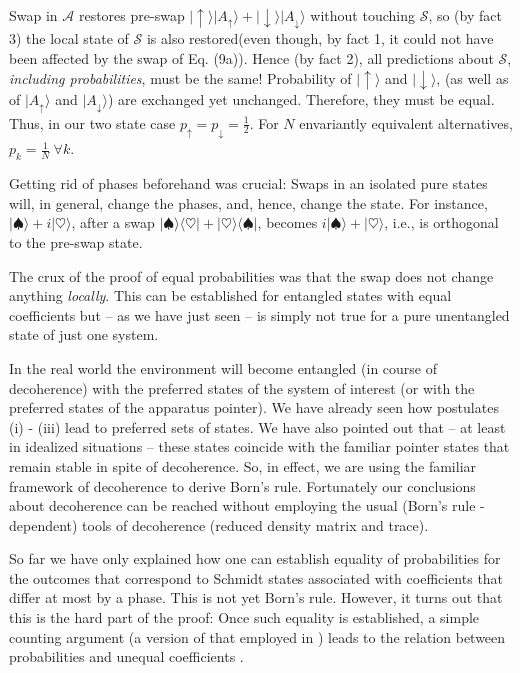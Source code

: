 \documentclass[aps,amsmath,amssymb,amsfonts,floatfix]{revtex4-1}
\newcommand{\bra}[1]    {\langle #1|}
\newcommand{\ket}[1]    {| #1 \rangle}
\newcommand{\cS}        {{\mathcal S}}
\newcommand{\cA}        {{\mathcal A}}
\newcommand{\+}         {\dagger}
\begin{document}
{%

\noindent  Swap in $\cA$ restores pre-swap $ \ket \uparrow \ket {A_\uparrow}  + \ket \downarrow \ket {A_\downarrow}$ without touching $\cS$, so (by fact 3) the local state of $\cS$  is also restored(even though, by fact 1, it could not have been affected by the swap of Eq. (9a)).
Hence (by fact 2), all predictions about $\cS$, {\it including probabilities}, must be the same!
Probability of $\ket \uparrow$ and $ \ket \downarrow$, (as well as of $\ket {A_\uparrow} $ and $\ket {A_\downarrow}$) are exchanged yet unchanged. Therefore, 
they must be equal. Thus, in our two state case 
$p_\uparrow=p_\downarrow= \frac 1 2$. For $N$ envariantly equivalent alternatives, $p_k= \frac 1 N\ \forall k$.

Getting rid of phases beforehand was crucial:
Swaps in an isolated pure states will, in general, change the phases, and, hence, change the state.  For instance, $\ket \spadesuit + i \ket \heartsuit$, after a swap $\ket \spadesuit \bra \heartsuit + \ket \heartsuit \bra \spadesuit$, becomes
$i \ket \spadesuit + \ket \heartsuit$, i.e., is orthogonal to the pre-swap state. 

The crux of the proof of
equal probabilities was that the swap does not change anything {\it locally}. This can be established
for entangled states with equal coefficients but -- as we have just seen -- is simply not true for a pure
unentangled state of just one system.

In the real world the environment will become entangled (in course of decoherence)
with the preferred states of the system of interest (or with the preferred states of the apparatus pointer).
We have already seen how postulates (i) - (iii) lead to preferred sets of states. We have also pointed
out that -- at least in idealized situations -- these states coincide with the familiar pointer states
that remain stable in spite of decoherence. So, in effect, we are using the familiar framework of
decoherence to derive Born's rule. Fortunately our conclusions about decoherence can be reached without
employing the usual (Born's rule - dependent) tools of decoherence (reduced density matrix and trace). %

So far we have only explained how one can establish equality of probabilities for the
outcomes that correspond to Schmidt states associated with coefficients that differ at most by a phase. This is not yet Born's rule. However, it turns out that this is the hard part of the proof: Once such equality is established, a simple counting argument (a version of that employed in  \cite{74,19,61,50}) leads to the relation between probabilities and unequal coefficients  \cite{76,78,75}.

}
\end{document}

